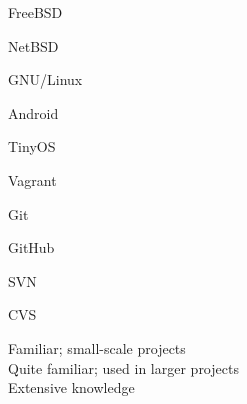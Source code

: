 \documentclass[a4paper,10pt]{article}
\begin{document}
\begin{itemize}
\begin{multicols}{3}
  \item FreeBSD   \hfill \twonotes
  \item NetBSD    \hfill \twonotes
  \item GNU/Linux \hfill \threenotes
  \item Android   \hfill \twonotes
  \item TinyOS    \hfill \onenote
\end{multicols}

\begin{multicols}{3}
  \item Vagrant \hfill \twonotes
  \item Git     \hfill \twonotes
  \item GitHub  \hfill \twonotes
  \item SVN     \hfill \onenote
  \item CVS     \hfill \onenote
\end{multicols}


\end{itemize}

\vspace{1em}

\begin{center}
\parbox[c]{8cm}{
  \onenote Familiar; small-scale projects \\
  \twonotes Quite familiar; used in larger projects \\
  \threenotes Extensive knowledge
}
\end{center}
\end{document}
